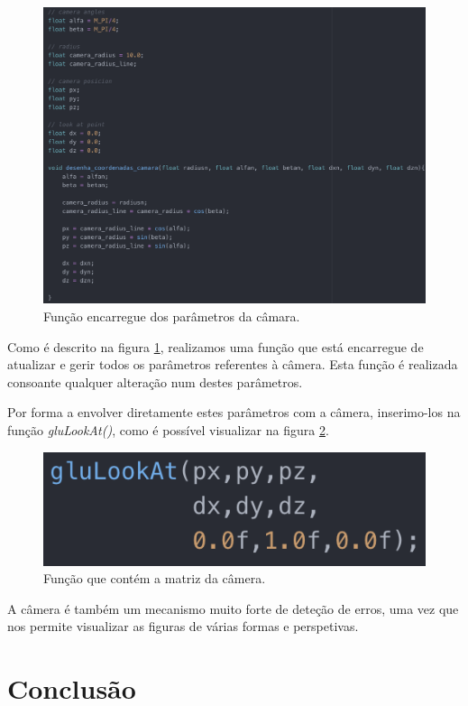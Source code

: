 \documentclass[a4paper]{article}
\begin{document}
\begin{figure}[H]
\centering
\includegraphics[scale=0.40]{funcao_desenha.png}
\caption{Função encarregue dos parâmetros da câmara.}
\label{img:desenha}
\end{figure}

Como é descrito na figura \ref{img:desenha}, realizamos uma função que está encarregue de atualizar e gerir todos os parâmetros referentes à câmera. Esta função é realizada consoante qualquer alteração num destes parâmetros.

Por forma a envolver diretamente estes parâmetros com a câmera, inserimo-los na função \emph{gluLookAt()}, como é possível visualizar na figura \ref{img:glulookat}.

\begin{figure}[H]
\centering
\includegraphics[scale=0.70]{gluLookAt.png}
\caption{Função que contém a matriz da câmera.}
\label{img:glulookat}
\end{figure}

A câmera é também um mecanismo muito forte de deteção de erros, uma vez que nos permite visualizar as figuras de várias formas e perspetivas.


\section{Conclusão}
\label{sec:conclusao}
\end{document}
